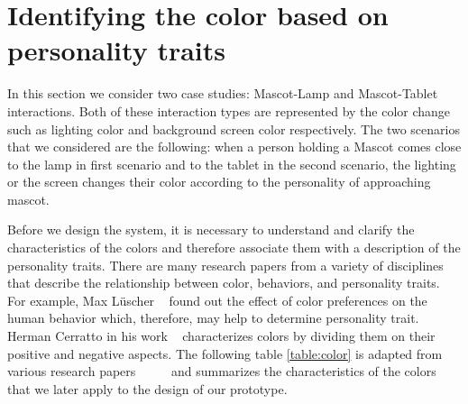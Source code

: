 \section{Identifying the color based on personality traits}
\label{sec:Identifying the color based on personality traits}

In this section we consider two case studies: Mascot-Lamp and Mascot-Tablet interactions. Both of these interaction types are represented by the color change such as lighting color and background screen color respectively. The two scenarios that we considered are the following: when a person holding a Mascot comes close to the lamp in first scenario and to the tablet in the second scenario, the lighting or the screen changes their color according to the personality of approaching mascot. 

Before we design the system, it is necessary to understand and clarify the characteristics of the colors and therefore associate them with a description of the personality traits. There are many research papers from a variety of disciplines that describe the relationship between color, behaviors, and personality traits. For example, Max Lüscher ~\cite{luscher1971luscher} found out the effect of color preferences on the human behavior which, therefore, may help to determine personality trait. Herman Cerratto in his work ~\cite{cerrato2012meaning} characterizes colors by dividing them on their positive and negative aspects. The following table \ref{table:color} is adapted from various research papers ~\cite{luscher1971luscher} ~\cite{cerrato2012meaning} ~\cite{schaie1964color} and summarizes the characteristics of the colors that we later apply to the design of our prototype.

